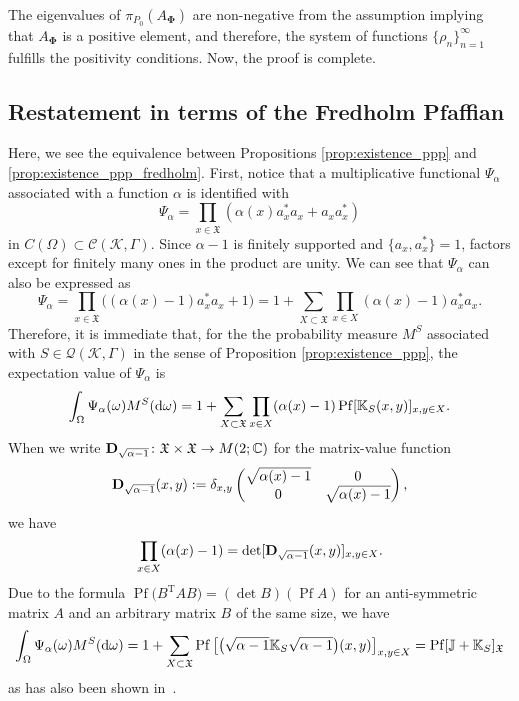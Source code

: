 \documentclass[pdftex]{sigma}
\numberwithin{equation}{section}
\newcommand{\pf}{\operatorname{Pf}}
\newcommand{\mfrak}[1]{\mathfrak{#1}}
\newcommand{\mcal}[1]{\mathcal{#1}}
\newcommand{\mbb}[1]{\mathbb{#1}}
\newcommand{\mrm}[1]{\mathrm{#1}}
\begin{document}
The eigenvalues of $\pi_{P_{0}} (A_{\bm{\Phi}} )$ are non-negative from the assumption implying that $A_{\bm{\Phi}}$ is a positive element, and therefore, the system of functions $\{\rho_{n}\}_{n=1}^{\infty}$ fulfills the positivity conditions.
Now, the proof is complete.

\subsection{Restatement in terms of the Fredholm Pfaffian}
Here, we see the equivalence between Propositions \ref{prop:existence_ppp} and \ref{prop:existence_ppp_fredholm}.
First, notice that a multiplicative functional $\Psi_{\alpha}$ associated with a function $\alpha$ is identified with
\begin{equation*}
	\Psi_{\alpha}=\prod_{x\in\mfrak{X}}\left(\alpha (x)a_{x}^{\ast}a_{x}+a_{x}a_{x}^{\ast}\right)
\end{equation*}
in $C(\Omega)\subset \mcal{C}(\mcal{K},\Gamma)$. Since $\alpha-1$ is finitely supported and $\{a_{x},a_{x}^{\ast}\}=1$, factors except for finitely many ones in the product are unity. We can see that $\Psi_{\alpha}$ can also be expressed as
\begin{equation}
\label{eq:multiplicative_functional_expansion}
	\Psi_{\alpha}=\prod_{x\in\mfrak{X}}\big((\alpha(x)-1)a_{x}^{\ast}a_{x}+1\big)=1+\sum_{X\subset\mfrak{X}}\prod_{x\in X}(\alpha (x)-1)a_{x}^{\ast}a_{x}.
\end{equation}
Therefore, it is immediate that, for the the probability measure $M^{S}$ associated with $S\in\mcal{Q}(\mcal{K},\Gamma)$ in the sense of Proposition \ref{prop:existence_ppp}, the expectation value of $\Psi_{\alpha}$ is
\begin{equation*}
	\int_{\Omega}\Psi_{\alpha}(\omega)M^{S}({\rm d}\omega)=1+\sum_{X\subset\mfrak{X}}\prod_{x\in X}(\alpha (x)-1) \pf [\mbb{K}_{S}(x,y) ]_{x,y\in X}.
\end{equation*}
When we write ${\bf D}_{\sqrt{\alpha-1}}\colon \mfrak{X}\times\mfrak{X}\to M(2;\mbb{C})$ for the matrix-value function
\begin{equation*}
	{\bf D}_{\sqrt{\alpha-1}}(x,y):=\delta_{x,y}\left(
		\begin{matrix}
			\sqrt{\alpha (x)-1} & 0 \\
			0 & \sqrt{\alpha (x)-1}
		\end{matrix}
	\right),
\end{equation*}
we have
\[ \prod_{x\in X}(\alpha(x)-1)=\det [{\bf D}_{\sqrt{\alpha-1}}(x,y)]_{x,y\in X}.\] Due to the formula $\pf \big(B^{\mrm{T}}AB\big)=(\det B)(\pf A)$ for an anti-symmetric matrix $A$ and an arbitrary matrix $B$ of the same size, we have
\begin{equation*}
	\int_{\Omega}\Psi_{\alpha}(\omega)M^{S}({\rm d}\omega)=1+\sum_{X\subset\mfrak{X}}\pf\big[\big(\sqrt{\alpha -1}\mbb{K}_{S}\sqrt{\alpha -1}\big)(x,y)\big]_{x,y\in X}=\pf [\mbb{J}+\mbb{K}_{S} ]_{\mfrak{X}}
\end{equation*}
as has also been shown in~\cite{Rains2000}.
\end{document}
